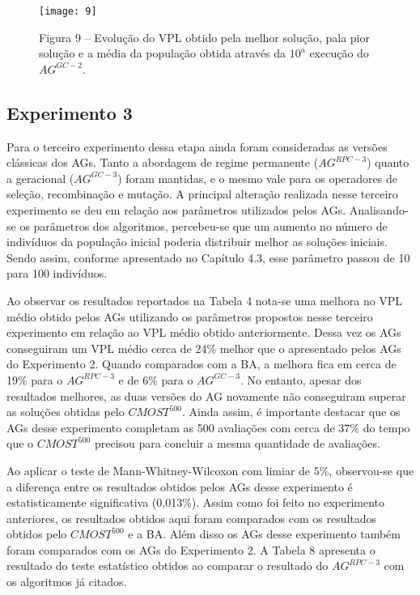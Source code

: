 \begin{figure}[H]

\centering
\texttt{[image: 9]}

\caption{Figura 9 – Evolução do VPL obtido pela melhor solução, pala pior solução e a média da população obtida através da $10^a$ execução do $AG^{GC-2}$.}

\end{figure}

\subsection{Experimento 3}

Para o terceiro experimento dessa etapa ainda foram consideradas as versões clássicas dos AGs. Tanto a abordagem de regime permanente ($AG^{RPC-3}$) quanto a geracional ($AG^{GC-3}$) foram mantidas, e o mesmo vale para os operadores de seleção, recombinação e mutação. A principal alteração realizada nesse terceiro experimento se deu em relação aos parâmetros utilizados pelos AGs. Analisando-se os parâmetros dos algoritmos, percebeu-se que um aumento no número de indivíduos da população inicial poderia distribuir melhor as soluções iniciais. Sendo assim, conforme apresentado no Capítulo 4.3, esse parâmetro passou de 10 para 100 indivíduos.

Ao observar os resultados reportados na Tabela 4 nota-se uma melhora no VPL médio obtido pelos AGs utilizando os parâmetros propostos nesse terceiro experimento em relação ao VPL médio obtido anteriormente. Dessa vez os AGs conseguiram um VPL médio cerca de 24\% melhor que o apresentado pelos AGs do Experimento 2. Quando comparados com a BA, a melhora fica em cerca de 19\% para o $AG^{RPC-3}$ e de 6\% para o $AG^{GC-3}$. No entanto, apesar dos resultados melhores, as duas versões do AG novamente não conseguiram superar as soluções obtidas pelo $CMOST^{500}$. Ainda assim, é importante destacar que os AGs desse experimento completam as 500 avaliações com cerca de 37\% do tempo que o $CMOST^{500}$ precisou para concluir a mesma quantidade de avaliações.

Ao aplicar o teste de Mann-Whitney-Wilcoxon com limiar de 5\%, observou-se que a diferença entre os resultados obtidos pelos AGs desse experimento é estatisticamente significativa (0,013\%). Assim como foi feito no experimento anteriores, os resultados obtidos aqui foram comparados com os resultados obtidos pelo $CMOST^{500}$ e a BA. Além disso os AGs desse experimento também foram comparados com os AGs do Experimento 2. A Tabela 8 apresenta o resultado do teste estatístico obtidos ao comparar o resultado do $AG^{RPC-3}$ com os algoritmos já citados.

